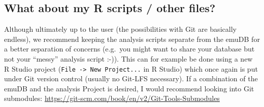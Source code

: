 \documentclass[
]{book}
\begin{document}
\hypertarget{what-about-my-r-scripts-other-files}{%
\subsection{What about my R scripts / other files?}\label{what-about-my-r-scripts-other-files}}

Although ultimately up to the user (the possibilities with Git are basically endless), we recommend keeping the analysis scripts separate from the emuDB for a better separation of concerns (e.g.~you might want to share your database but not your ``messy'' analysis script :-)). This can for example be done using a new R Studio project (\texttt{File\ -\textgreater{}\ New\ Project...} in R Studio) which once again is put under Git version control (usually no Git-LFS necessary). If a combination of the emuDB and the analysis Project is desired, I would recommend looking into Git submodules: \url{https://git-scm.com/book/en/v2/Git-Tools-Submodules}

  
\end{document}

